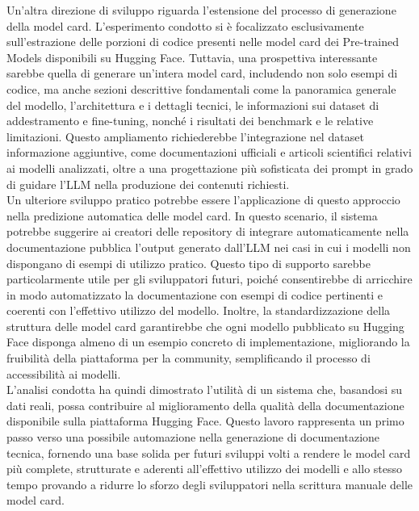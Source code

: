 \documentclass{article}
\begin{document}
Un'altra direzione di sviluppo riguarda l'estensione del processo di generazione della model card. L’esperimento condotto si è focalizzato esclusivamente sull’estrazione delle porzioni di codice presenti nelle model card dei Pre-trained Models disponibili su Hugging Face. Tuttavia, una prospettiva interessante sarebbe quella di generare un'intera model card, includendo non solo esempi di codice, ma anche sezioni descrittive fondamentali come la panoramica generale del modello, l'architettura e i dettagli tecnici, le informazioni sui dataset di addestramento e fine-tuning, nonché i risultati dei benchmark e le relative limitazioni. Questo ampliamento richiederebbe l’integrazione nel dataset informazione aggiuntive, come documentazioni ufficiali e articoli scientifici relativi ai modelli analizzati, oltre a una progettazione più sofisticata dei prompt in grado di guidare l’LLM nella produzione dei contenuti richiesti.\\
Un ulteriore sviluppo pratico potrebbe essere l'applicazione di questo approccio nella predizione automatica delle model card. In questo scenario, il sistema potrebbe suggerire ai creatori delle repository di integrare automaticamente nella documentazione pubblica l’output generato dall’LLM nei casi in cui i modelli non dispongano di esempi di utilizzo pratico. Questo tipo di supporto sarebbe particolarmente utile per gli sviluppatori futuri, poiché consentirebbe di arricchire in modo automatizzato la documentazione con esempi di codice pertinenti e coerenti con l'effettivo utilizzo del modello. Inoltre, la standardizzazione della struttura delle model card garantirebbe che ogni modello pubblicato su Hugging Face disponga almeno di un esempio concreto di implementazione, migliorando la fruibilità della piattaforma per la community, semplificando il processo di accessibilità ai modelli.\\
L’analisi condotta ha quindi dimostrato l’utilità di un sistema che, basandosi su dati reali, possa contribuire al miglioramento della qualità della documentazione disponibile sulla piattaforma Hugging Face. Questo lavoro rappresenta un primo passo verso una possibile automazione nella generazione di documentazione tecnica, fornendo una base solida per futuri sviluppi volti a rendere le model card più complete, strutturate e aderenti all’effettivo utilizzo dei modelli e allo stesso tempo provando a ridurre lo sforzo degli sviluppatori nella scrittura manuale delle model card.



\appendix
\end{document}
